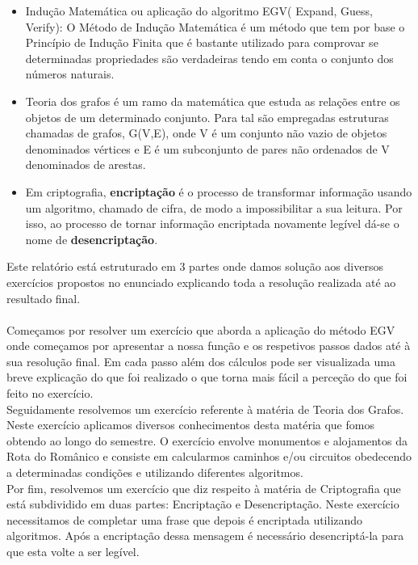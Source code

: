\documentclass[12pt]{article}
\begin{document}
    \begin{itemize}
    \item Indução Matemática ou aplicação do algoritmo EGV( Expand, Guess, Verify):
    O Método de Indução Matemática é um método que tem por base o Princípio de Indução Finita que é bastante utilizado para comprovar se determinadas propriedades são verdadeiras tendo em conta o conjunto dos números naturais.
    \item Teoria dos grafos é um ramo da matemática que estuda as relações entre os objetos de um determinado conjunto. Para tal são empregadas estruturas chamadas de grafos, G(V,E), onde V é um conjunto não vazio de objetos denominados vértices e E é um subconjunto de pares não ordenados de V denominados de arestas.
    \item Em criptografia, \textbf{encriptação} é o processo de transformar informação usando um algoritmo, chamado de cifra, de modo a impossibilitar a sua leitura. Por isso, ao processo de tornar informação encriptada novamente legível dá-se o nome de \textbf{desencriptação}.

    \end{itemize}
    
    \noindent Este relatório está estruturado em 3 partes onde damos solução aos diversos exercícios propostos no enunciado explicando toda a resolução realizada até ao resultado final.
    \\\\Começamos por resolver um exercício que aborda a aplicação do método EGV onde começamos por apresentar a nossa função e os respetivos passos dados até à sua resolução final. Em cada passo além dos cálculos pode ser visualizada uma breve explicação do que foi realizado o que torna mais fácil a perceção do que foi feito no exercício.\\
    
    \noindent Seguidamente resolvemos um exercício referente à matéria de Teoria dos Grafos. Neste exercício aplicamos diversos conhecimentos desta matéria que fomos obtendo ao longo do semestre. O exercício envolve monumentos e alojamentos da Rota do Românico e consiste em calcularmos caminhos e/ou circuitos obedecendo a determinadas condições e utilizando diferentes algoritmos.\\
    
    \noindent Por fim, resolvemos um exercício que diz respeito à matéria de Criptografia que está subdividido em duas partes: Encriptação e Desencriptação. Neste exercício necessitamos de completar uma frase que depois é encriptada utilizando algoritmos. Após a encriptação dessa mensagem é necessário desencriptá-la para que esta volte a ser legível.
     
\end{document}
